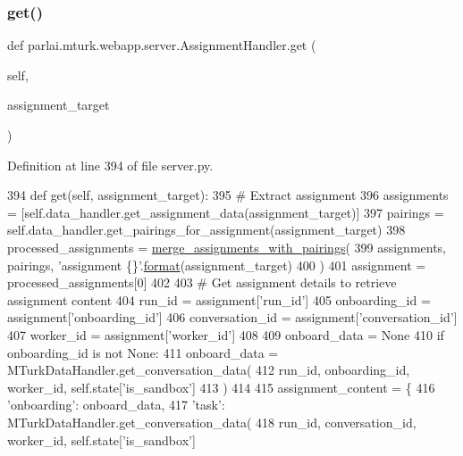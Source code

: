 \subsubsection{\texorpdfstring{get()}{get()}}
{\footnotesize\ttfamily def parlai.\+mturk.\+webapp.\+server.\+Assignment\+Handler.\+get (\begin{DoxyParamCaption}\item[{}]{self,  }\item[{}]{assignment\+\_\+target }\end{DoxyParamCaption})}



Definition at line 394 of file server.\+py.


\begin{DoxyCode}
394     \textcolor{keyword}{def }get(self, assignment\_target):
395         \textcolor{comment}{# Extract assignment}
396         assignments = [self.data\_handler.get\_assignment\_data(assignment\_target)]
397         pairings = self.data\_handler.get\_pairings\_for\_assignment(assignment\_target)
398         processed\_assignments = \hyperlink{namespaceparlai_1_1mturk_1_1webapp_1_1server_abe6ddbf97d0e5c26315fa927ed076489}{merge\_assignments\_with\_pairings}(
399             assignments, pairings, \textcolor{stringliteral}{'assignment \{\}'}.\hyperlink{namespaceparlai_1_1chat__service_1_1services_1_1messenger_1_1shared__utils_a32e2e2022b824fbaf80c747160b52a76}{format}(assignment\_target)
400         )
401         assignment = processed\_assignments[0]
402 
403         \textcolor{comment}{# Get assignment details to retrieve assignment content}
404         run\_id = assignment[\textcolor{stringliteral}{'run\_id'}]
405         onboarding\_id = assignment[\textcolor{stringliteral}{'onboarding\_id'}]
406         conversation\_id = assignment[\textcolor{stringliteral}{'conversation\_id'}]
407         worker\_id = assignment[\textcolor{stringliteral}{'worker\_id'}]
408 
409         onboard\_data = \textcolor{keywordtype}{None}
410         \textcolor{keywordflow}{if} onboarding\_id \textcolor{keywordflow}{is} \textcolor{keywordflow}{not} \textcolor{keywordtype}{None}:
411             onboard\_data = MTurkDataHandler.get\_conversation\_data(
412                 run\_id, onboarding\_id, worker\_id, self.state[\textcolor{stringliteral}{'is\_sandbox'}]
413             )
414 
415         assignment\_content = \{
416             \textcolor{stringliteral}{'onboarding'}: onboard\_data,
417             \textcolor{stringliteral}{'task'}: MTurkDataHandler.get\_conversation\_data(
418                 run\_id, conversation\_id, worker\_id, self.state[\textcolor{stringliteral}{'is\_sandbox'}]

\end{DoxyCode}
